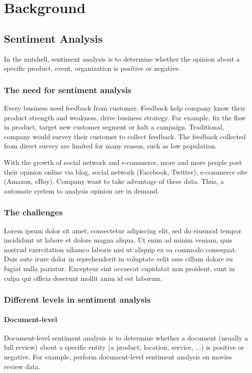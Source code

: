 \chapter{Background}

\section{Sentiment Analysis}
In the nutshell, sentiment analysis is to determine whether the opinion about a specific product, event, organization is positive or negative.
\subsection{The need for sentiment analysis}
Every business need feedback from customer. Feedback help company know their product strength and weakness, drive business strategy. For example, fix the flaw in product, target new customer segment or halt a campaign. Traditional, company would survey their customer to collect feedback.  The feedback collected from direct survey are limited for many reason, such as low population.

With the growth of social network and e-commerce, more and more people post their opinion online via blog, social network (Facebook, Twitter), e-commerce site (Amazon, eBay). Company want to take advantage of these data. Thus, a automate system to analysis opinion are in demand.

\subsection{The challenges}
Lorem ipsum dolor sit amet, consectetur adipiscing elit, sed do eiusmod tempor incididunt ut labore et dolore magna aliqua. Ut enim ad minim veniam, quis nostrud exercitation ullamco laboris nisi ut aliquip ex ea commodo consequat. Duis aute irure dolor in reprehenderit in voluptate velit esse cillum dolore eu fugiat nulla pariatur. Excepteur sint occaecat cupidatat non proident, sunt in culpa qui officia deserunt mollit anim id est laborum.

\subsection{Different levels in sentiment analysis}
\subsubsection{Document-level}
Document-level sentiment analysis is to determine whether a document (usually a full review) about a specific entity (a product, location, service, ...) is positive or negative. For example, \cite{pang2002thumbs} perform document-level sentiment analysis on movies review data.
